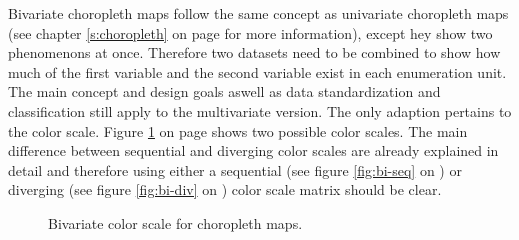 Bivariate choropleth maps follow the same concept as univariate choropleth maps (see chapter \ref{s:choropleth} on page \pageref{s:choropleth} for more information), except hey show two phenomenons at once. Therefore two datasets need to be combined to show how much of the first variable and the second variable exist in each enumeration unit. The main concept and design goals aswell as data standardization and classification still apply to the multivariate version. The only adaption pertains to the color scale. Figure \ref{fig:bi-scale} on page \pageref{fig:bi-scale} shows two possible color scales. The main difference between sequential and diverging color scales are already explained in detail and therefore using either a sequential (see figure \ref{fig:bi-seq} on \pageref{fig:bi-seq}) or diverging (see figure \ref{fig:bi-div} on \pageref{fig:bi-div}) color scale matrix should be clear.

\begin{figure}[!htb]
  \centering
  \qquad
  \caption[
    Bivariate color scale for choropleth maps, Urldate: 04.2014 \newline
    \small\texttt{\url{https://axismaps.github.io/thematic-cartography/images/seqxseq.png}} \newline
    \small\texttt{\url{https://axismaps.github.io/thematic-cartography/images/divxdiv.png}}
  ]{
    Bivariate color scale for choropleth maps.
  }
  \label{fig:bi-scale}
\end{figure}


